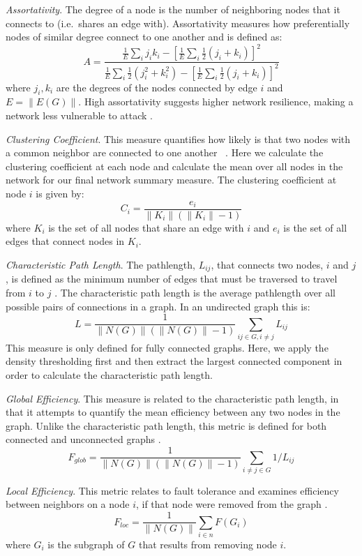 \documentclass{frontiersSCNS} %
\begin{document}
\emph{Assortativity}. The degree of a node is the number of neighboring nodes that it connects to (i.e.\ shares an edge with). Assortativity measures how preferentially nodes of similar degree connect to one another \citep{Newman2006a} and is defined as:
$$A =  \frac{ \frac{1}{E} \sum_{i}{j_i k_i} - [ \frac{1}{E} \sum_{i}{ \frac{1}{2} (j_i + k_i)} ]^2 }{ \frac{1}{E} \sum_{i}{ \frac{1}{2}( j_{i}^{2} + k_{i}^{2} ) } - [ \frac{1}{E} \sum_{i}{ \frac{1}{2} (j_i + k_i)} ]^2  } $$
where $j_i,k_i$ are the degrees of the nodes connected by edge $i$ and $E = \|E(G)\|$. High assortativity suggests higher network resilience, making a network less vulnerable to attack \citep{Newman2002}.

\emph{Clustering Coefficient}. This measure quantifies how likely is that two nodes with a common neighbor are connected to one another ~\citep{Watts1998}. Here we calculate the clustering coefficient at each node and calculate the mean over all nodes in the network for our final network summary measure. The clustering coefficient at node $i$ is given by:
$$C_i = \frac{e_i}{\|K_i\| ( \|K_i\| -1 )}$$
where $K_i$ is the set of all nodes that share an edge with $i$ and $e_i$ is the set of all edges that connect nodes in $K_i$.

\emph{Characteristic Path Length}. The pathlength, $L_{ij}$, that connects two nodes, $i$ and $j$, is defined as the minimum number of edges that must be traversed to travel from $i$ to $j$ \citep{Dijkstra1959}. The characteristic path length is the average pathlength over all possible pairs of connections in a graph. In an undirected graph this is:
$$L = \frac{1}{\|N(G)\|(\|N(G)\|-1)} \sum_{ij \in G, i \neq j}{L_{ij}}$$
This measure is only defined for fully connected graphs. Here, we apply the density thresholding first and then extract the largest connected component in order to calculate the characteristic path length.

\emph{Global Efficiency}. This measure is related to the
characteristic path length, in that it attempts to quantify the mean
efficiency between any two nodes in the graph. Unlike the
characteristic path length, this metric is defined for both connected and unconnected graphs \citep{Latora2001}.
$$F_{glob} = \frac{1}{\|N(G)\|(\|N(G)\|-1)} \sum_{i \neq j \in G}{1/L_{ij}}$$

\emph{Local Efficiency}. This metric relates to fault tolerance and examines efficiency between neighbors on a node $i$, if that node were removed from the graph \citep{Latora2001}.
$$F_{loc} = \frac{1}{\|N(G)\|} \sum_{i \in n}{F(G_i)}$$
where $G_i$ is the subgraph of $G$ that results from removing node $i$.
\end{document}
